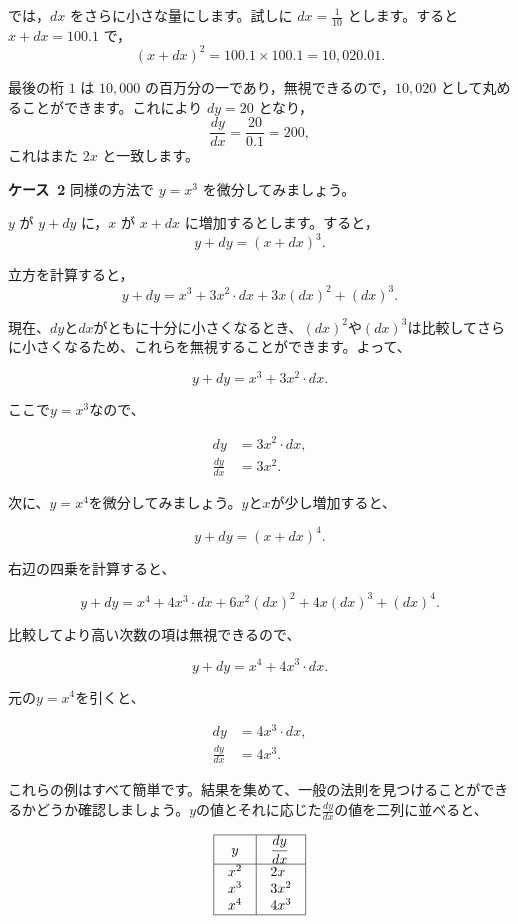 \documentclass[a4paper,11pt,openany]{ltjsbook}
\newcommand{\DStrut}{}
\begin{document}
では，$dx$ をさらに小さな量にします。試しに $dx = \frac{1}{10}$ とします。すると $x + dx = 100.1$ で，
\[
(x+dx)^2 = 100.1 \times 100.1 = 10,020.01.
\]

最後の桁 $1$ は $10,000$ の百万分の一であり，無視できるので，$10,020$ として丸めることができます。これにより $dy = 20$ となり，$$\frac{dy}{dx} = \frac{20}{0.1} = 200,$$ これはまた $2x$ と一致します。

\par\medskip\noindent\textbf{ケース~2}
同様の方法で $y = x^3$ を微分してみましょう。

$y$ が $y + dy$ に，$x$ が $x + dx$ に増加するとします。すると，
\[
y + dy = (x + dx)^3.
\]

立方を計算すると，
\[
y + dy = x^3 + 3x^2 \cdot dx + 3x(dx)^2 + (dx)^3.
\]

現在、$dy$と$dx$がともに十分に小さくなるとき、$(dx)^2$や$(dx)^3$は比較してさらに小さくなるため、これらを無視することができます。よって、

$$y + dy = x^3 + 3x^2 \cdot dx.$$

ここで$y = x^3$なので、

\begin{align*}
dy &= 3x^2 \cdot dx, \\
\frac{dy}{dx} &= 3x^2.
\end{align*}

次に、$y = x^4$を微分してみましょう。$y$と$x$が少し増加すると、

$$y + dy = (x + dx)^4.$$

右辺の四乗を計算すると、

$$y + dy = x^4 + 4x^3 \cdot dx + 6x^2(dx)^2 + 4x(dx)^3 + (dx)^4.$$

比較してより高い次数の項は無視できるので、

$$y + dy = x^4 + 4x^3 \cdot dx.$$

元の$y = x^4$を引くと、

\begin{align*}
dy &= 4x^3 \cdot dx, \\
\frac{dy}{dx} &= 4x^3.
\end{align*}

これらの例はすべて簡単です。結果を集めて、一般の法則を見つけることができるかどうか確認しましょう。$y$の値とそれに応じた$\frac{dy}{dx}$の値を二列に並べると、

\[
\begin{array}{|@{\quad}c@{\quad}|@{\quad}l@{\quad}|}
\hline
y   & \DStrut\dfrac{dy}{dx} \\
\hline
x^2 & 2x  \\
x^3 & 3x^2  \\
x^4 & 4x^3  \\
\hline
\end{array}
\]
\end{document}
